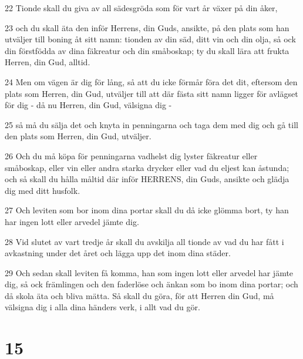 \par 22 Tionde skall du giva av all sädesgröda som för vart år växer på din åker,
\par 23 och du skall äta den inför Herrens, din Guds, ansikte, på den plats som han utväljer till boning åt sitt namn: tionden av din säd, ditt vin och din olja, så ock din förstfödda av dina fäkreatur och din småboskap; ty du skall lära att frukta Herren, din Gud, alltid.
\par 24 Men om vägen är dig för lång, så att du icke förmår föra det dit, eftersom den plats som Herren, din Gud, utväljer till att där fästa sitt namn ligger för avlägset för dig - då nu Herren, din Gud, välsigna dig -
\par 25 så må du sälja det och knyta in penningarna och taga dem med dig och gå till den plats som Herren, din Gud, utväljer.
\par 26 Och du må köpa för penningarna vadhelst dig lyster fäkreatur eller småboskap, eller vin eller andra starka drycker eller vad du eljest kan åstunda; och så skall du hålla måltid där inför HERRENS, din Guds, ansikte och glädja dig med ditt husfolk.
\par 27 Och leviten som bor inom dina portar skall du då icke glömma bort, ty han har ingen lott eller arvedel jämte dig.
\par 28 Vid slutet av vart tredje år skall du avskilja all tionde av vad du har fått i avkastning under det året och lägga upp det inom dina städer.
\par 29 Och sedan skall leviten få komma, han som ingen lott eller arvedel har jämte dig, så ock främlingen och den faderlöse och änkan som bo inom dina portar; och då skola äta och bliva mätta. Så skall du göra, för att Herren din Gud, må välsigna dig i alla dina händers verk, i allt vad du gör.

\chapter{15}

